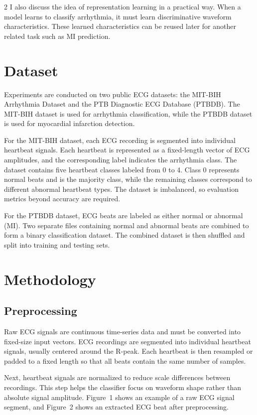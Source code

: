 \documentclass[10pt,a4paper]{article}
\begin{document}
\begin{multicols}{2}
I also discuss the idea of representation learning in a practical way. When a model learns to classify arrhythmia, it must learn discriminative waveform characteristics. These learned characteristics can be reused later for another related task such as MI prediction.

\section{Dataset}
Experiments are conducted on two public ECG datasets: the MIT-BIH Arrhythmia Dataset and the PTB Diagnostic ECG Database (PTBDB). The MIT-BIH dataset is used for arrhythmia classification, while the PTBDB dataset is used for myocardial infarction detection.

For the MIT-BIH dataset, each ECG recording is segmented into individual heartbeat signals. Each heartbeat is represented as a fixed-length vector of ECG amplitudes, and the corresponding label indicates the arrhythmia class. The dataset contains five heartbeat classes labeled from 0 to 4. Class 0 represents normal beats and is the majority class, while the remaining classes correspond to different abnormal heartbeat types. The dataset is imbalanced, so evaluation metrics beyond accuracy are required.

For the PTBDB dataset, ECG beats are labeled as either normal or abnormal (MI). Two separate files containing normal and abnormal beats are combined to form a binary classification dataset. The combined dataset is then shuffled and split into training and testing sets.

\section{Methodology}

\subsection{Preprocessing}
Raw ECG signals are continuous time-series data and must be converted into fixed-size input vectors. ECG recordings are segmented into individual heartbeat signals, usually centered around the R-peak. Each heartbeat is then resampled or padded to a fixed length so that all beats contain the same number of samples.

Next, heartbeat signals are normalized to reduce scale differences between recordings. This step helps the classifier focus on waveform shape rather than absolute signal amplitude. Figure~1 shows an example of a raw ECG signal segment, and Figure~2 shows an extracted ECG beat after preprocessing.


\end{multicols}
\end{document}

